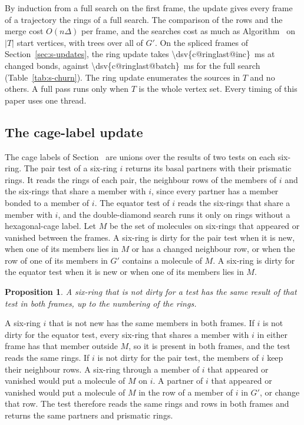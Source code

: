 \documentclass[preprint,12pt]{elsarticle}
\newtheorem{proposition}{Proposition}
\begin{document}
By induction from a full search on the first frame, the update gives
every frame of a trajectory the rings of a full search.
The comparison of the rows and the merge cost $O(n\Delta)$ per frame,
and the searches cost as much as Algorithm~ on $|T|$
start vertices, with trees over all of $G'$.
On the spliced frames of Section~\ref{sec:s-updates}, the ring update
takes \qty{\dsv{c@ringlast@inc}}{\milli\second} at
 changed bonds, against
\qty{\dsv{c@ringlast@batch}}{\milli\second} for the full search
(Table~\ref{tab:s-churn}).
The ring update enumerates the sources in $T$ and no others.
A full pass runs only when $T$ is the whole vertex set.
Every timing of this paper uses one thread.

\subsection{The cage-label update}
\label{sec:s-dirty}

The cage labels of Section~ are unions over the results
of two tests on each six-ring.
The pair test of a six-ring $i$ returns its basal partners with their
prismatic rings.
It reads the rings of each pair, the neighbour rows of the members of
$i$ and the six-rings that share a member with $i$, since every partner
has a member bonded to a member of $i$.
The equator test of $i$ reads the six-rings that share a member with
$i$, and the double-diamond search runs it only on rings without a
hexagonal-cage label.
Let $M$ be the set of molecules on six-rings that appeared or vanished
between the frames.
A six-ring is dirty for the pair test when it is new, when one of its
members lies in $M$ or has a changed neighbour row, or when the row of
one of its members in $G'$ contains a molecule of $M$.
A six-ring is dirty for the equator test when it is new or when one of
its members lies in $M$.

\begin{proposition}
\label{prop:s-dirty} A six-ring that is not dirty for a test has the
same result of that test in both frames, up to the numbering of the
rings.
\end{proposition}

\begin{pf}
A six-ring $i$ that is not new has the same members in both frames.
If $i$ is not dirty for the equator test, every six-ring that shares a
member with $i$ in either frame has that member outside $M$, so it is
present in both frames, and the test reads the same rings.
If $i$ is not dirty for the pair test, the members of $i$ keep their
neighbour rows.
A six-ring through a member of $i$ that appeared or vanished would put a
molecule of $M$ on $i$.
A partner of $i$ that appeared or vanished would put a molecule of $M$
in the row of a member of $i$ in $G'$, or change that row.
The test therefore reads the same rings and rows in both frames and
returns the same partners and prismatic rings.
\end{pf}
\end{document}
